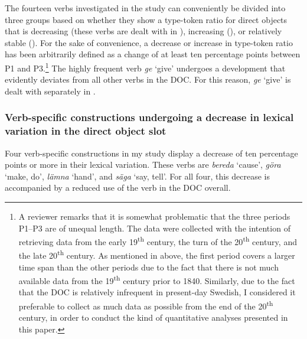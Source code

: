 \documentclass[output=paper]{langscibook}
\begin{document}
The fourteen verbs investigated in the study can conveniently be divided into three groups based on whether they show a type-token ratio for direct objects that is decreasing (these verbs are dealt with in ), increasing (), or relatively stable (). For the sake of convenience, a decrease or increase in type-token ratio has been arbitrarily defined as a change of at least ten percentage points between P1 and P3.\footnote{A reviewer remarks that it is somewhat problematic that the three periods P1–P3 are of unequal length. The data were collected with the intention of retrieving data from the early 19\textsuperscript{th} century, the turn of the 20\textsuperscript{th} century, and the late 20\textsuperscript{th} century. As mentioned in  above, the first period covers a larger time span than the other periods due to the fact that there is not much available data from the 19\textsuperscript{th} century prior to 1840. Similarly, due to the fact that the DOC is relatively infrequent in present-day Swedish, I considered it preferable to collect as much data as possible from the end of the 20\textsuperscript{th} century, in order to conduct the kind of quantitative analyses presented in this paper.}  The highly frequent verb \textit{ge} ‘give’ undergoes a development that evidently deviates from all other verbs in the DOC. For this reason, \textit{ge} ‘give’ is dealt with separately in .


\subsubsection{Verb-specific constructions undergoing a decrease in lexical variation in the direct object slot}\label{sec:valdeson:5.3.1}


Four verb-specific constructions in my study display a decrease of ten percentage points or more in their lexical variation. These verbs are \textit{bereda} ‘cause’, \textit{göra} ‘make, do’, \textit{lämna} ‘hand’, and \textit{säga} ‘say, tell’. For all four, this decrease is accompanied by a reduced use of the verb in the DOC overall.



\label{sec:valdeson:5.3.1.1}
\end{document}

